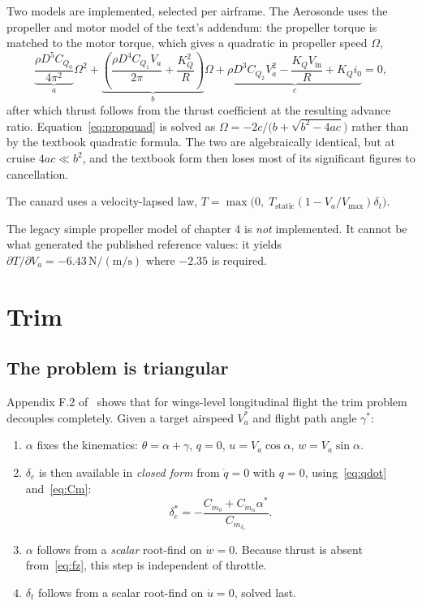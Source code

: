 \documentclass[11pt,a4paper]{article}
\newcommand{\dt}{\delta_t}
\newcommand{\de}{\delta_e}
\begin{document}
Two models are implemented, selected per airframe. The Aerosonde uses the
propeller and motor model of the text's addendum: the propeller torque is matched
to the motor torque, which gives a quadratic in propeller speed $\Omega$,
\begin{equation}
  \underbrace{\frac{\rho D^5 C_{Q_0}}{4\pi^2}}_{a}\Omega^2
  + \underbrace{\left(\frac{\rho D^4 C_{Q_1} V_a}{2\pi}
    + \frac{K_Q^2}{R}\right)}_{b}\Omega
  + \underbrace{\rho D^3 C_{Q_2} V_a^2
    - \frac{K_Q V_{\mathrm{in}}}{R} + K_Q i_0}_{c} = 0 ,
  \label{eq:propquad}
\end{equation}
after which thrust follows from the thrust coefficient at the resulting advance
ratio. Equation~\eqref{eq:propquad} is solved as
$\Omega = -2c/\bigl(b+\sqrt{b^2-4ac}\bigr)$ rather than by the textbook quadratic
formula. The two are algebraically identical, but at cruise $4ac \ll b^2$, and the
textbook form then loses most of its significant figures to cancellation.

The canard uses a velocity-lapsed law,
$T = \max\bigl(0,\;T_{\mathrm{static}}(1 - V_a/V_{\max})\dt\bigr)$.

The legacy simple propeller model of chapter 4 is \emph{not} implemented. It
cannot be what generated the published reference values: it yields
$\partial T/\partial V_a = -6.43\,\mathrm{N/(m/s)}$ where $-2.35$ is required.

\section{Trim}\label{sec:trim}

\subsection{The problem is triangular}

Appendix F.2 of~\cite{beard} shows that for wings-level longitudinal flight the
trim problem decouples completely. Given a target airspeed $V_a^*$ and flight path
angle $\gamma^*$:

\begin{enumerate}
\item $\alpha$ fixes the kinematics:
  $\theta = \alpha + \gamma$, $q = 0$, $u = V_a\cos\alpha$, $w = V_a\sin\alpha$.
\item $\de$ is then available in \emph{closed form} from $\dot q = 0$
  with $q=0$, using~\eqref{eq:qdot} and~\eqref{eq:Cm}:
  \begin{equation}
    \de^* = -\frac{C_{m_0} + C_{m_\alpha}\alpha^*}{C_{m_{\de}}} .
    \label{eq:detrim}
  \end{equation}
\item $\alpha$ follows from a \emph{scalar} root-find on $\dot w = 0$. Because
  thrust is absent from~\eqref{eq:fz}, this step is independent of throttle.
\item $\dt$ follows from a scalar root-find on $\dot u = 0$, solved last.
\end{enumerate}
\end{document}
